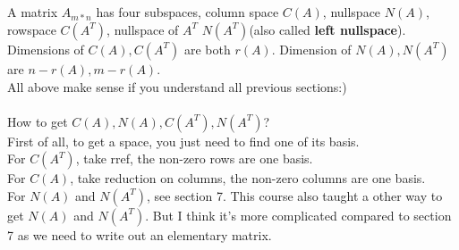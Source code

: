 \documentclass{article}
\begin{document}
\begin{spacing}{1.5}
\section{}
A matrix $A_{m*n}$ has four subspaces, column space $C(A)$, nullspace  $N(A)$, rowspace $C(A^T)$, nullspace of $A^T$ $N(A^T)$(also called {\bfseries left nullspace}). \\
Dimensions of $C(A), C(A^T)$ are both $r(A)$. Dimension of $N(A), N(A^T)$ are $n-r(A), m-r(A)$. \\
All above make sense if you understand all previous sections:)\\
\\How to get $C(A), N(A), C(A^T), N(A^T)$?\\
First of all, to get a space, you just need to find one of its basis.\\
For $C(A^T)$, take rref, the non-zero rows are one basis.\\
For $C(A)$, take reduction on columns, the non-zero columns are one basis.\\
For $N(A)$ and $N(A^T)$, see section 7. This course also taught a other way to get $N(A)$ and $N(A^T)$. But I think it's more complicated compared to section 7 as we need to write out an elementary matrix.\\



\end{spacing}
\end{document}
